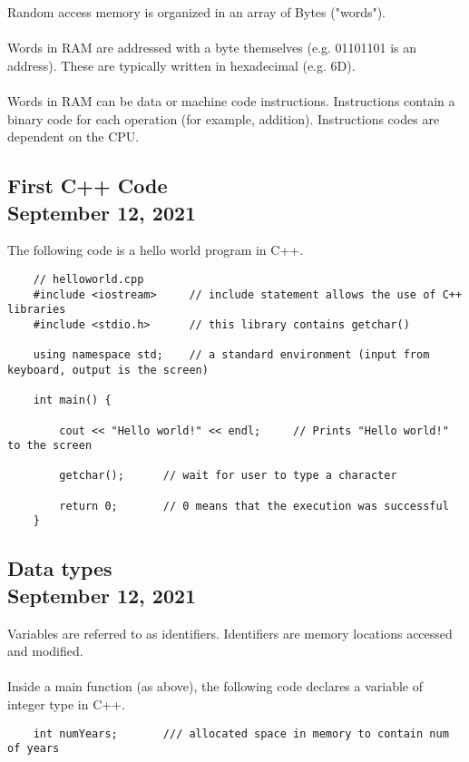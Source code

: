 \documentclass[]{article}
\begin{document}
Random access memory is organized in an array of Bytes ("words"). \\\\
Words in RAM are addressed with a byte themselves (e.g. 01101101 is an address). These are typically written in hexadecimal (e.g. 6D). \\\\
Words in RAM can be data or machine code instructions. Instructions contain a binary code for each operation (for example, addition). Instructions codes are dependent on the CPU.\\

\subsection{First C++ Code\\ {\large \normalfont September 12, 2021}}
\bigbreak

The following code is a hello world program in C++.

\begin{lstlisting}
	// helloworld.cpp
	#include <iostream>		// include statement allows the use of C++ libraries
	#include <stdio.h>		// this library contains getchar()
	
	using namespace std;	// a standard environment (input from keyboard, output is the screen)
	
	int main() {
		
		cout << "Hello world!" << endl;		// Prints "Hello world!" to the screen
		
		getchar();      // wait for user to type a character
		
		return 0;		// 0 means that the execution was successful
	}
\end{lstlisting}
\bigbreak

\subsection{Data types\\ {\large \normalfont September 12, 2021}}
\bigbreak

Variables are referred to as identifiers. Identifiers are memory locations accessed and modified. \\\\
Inside a main function (as above), the following code declares a variable of integer type in C++. 

\begin{lstlisting}
	int numYears;       /// allocated space in memory to contain num of years
\end{lstlisting}
\bigbreak
\end{document}
